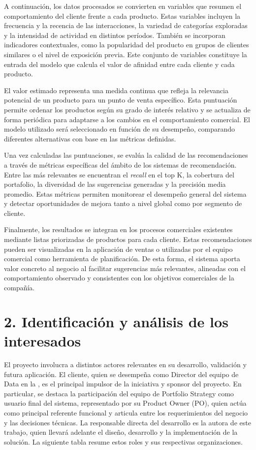 \documentclass[
11pt, %
]{charter}
\begin{document}
A continuación, los datos procesados se convierten en variables que resumen el comportamiento del cliente frente a cada producto. Estas variables incluyen la frecuencia y la recencia de las interacciones, la variedad de categorías exploradas y la intensidad de actividad en distintos períodos. También se incorporan indicadores contextuales, como la popularidad del producto en grupos de clientes similares o el nivel de exposición previa. Este conjunto de variables constituye la entrada del modelo que calcula el valor de afinidad entre cada cliente y cada producto.

El valor estimado representa una medida continua que refleja la relevancia potencial de un producto para un punto de venta específico. Esta puntuación permite ordenar los productos según su grado de interés relativo y se actualiza de forma periódica para adaptarse a los cambios en el comportamiento comercial. El modelo utilizado será seleccionado en función de su desempeño, comparando diferentes alternativas con base en las métricas definidas.

Una vez calculadas las puntuaciones, se evalúa la calidad de las recomendaciones a través de métricas específicas del ámbito de los sistemas de recomendación. Entre las más relevantes se encuentran el \textit{recall} en el top K, la cobertura del portafolio, la diversidad de las sugerencias generadas y la precisión media promedio. Estas métricas permiten monitorear el desempeño general del sistema y detectar oportunidades de mejora tanto a nivel global como por segmento de cliente.

Finalmente, los resultados se integran en los procesos comerciales existentes mediante listas priorizadas de productos para cada cliente. Estas recomendaciones pueden ser visualizadas en la aplicación de ventas o utilizadas por el equipo comercial como herramienta de planificación. De esta forma, el sistema aporta valor concreto al negocio al facilitar sugerencias más relevantes, alineadas con el comportamiento observado y consistentes con los objetivos comerciales de la compañía.

\section{2. Identificación y análisis de los interesados}
\label{sec:interesados}

El proyecto involucra a distintos actores relevantes en su desarrollo, validación y futura aplicación.  El cliente, quien se desempeña como Director del equipo de Data en la \empclientename, es el principal impulsor de la iniciativa y sponsor del proyecto. En particular, se destaca la participación del equipo de Portfolio Strategy como usuario final del sistema, representado por su Product Owner (PO), quien actúa como principal referente funcional y articula entre los requerimientos del negocio y las decisiones técnicas. La responsable directa del desarrollo es la autora de este trabajo, quien llevará adelante el diseño, desarrollo y la implementación de la solución. La siguiente tabla resume estos roles y sus respectivas organizaciones.
\end{document}
